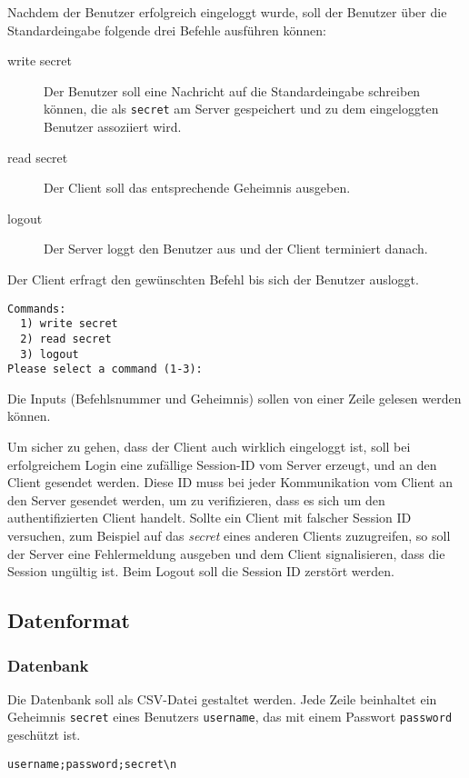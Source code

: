 Nachdem der Benutzer erfolgreich eingeloggt wurde, soll der Benutzer über die
Standardeingabe folgende drei Befehle ausführen können:
\begin{description}
\item[write secret] Der Benutzer soll eine Nachricht auf die Standardeingabe
  schreiben können, die als \texttt{secret} am Server gespeichert und zu dem
  eingeloggten Benutzer assoziiert wird.
\item[read secret] Der Client soll das entsprechende Geheimnis
  ausgeben. 
\item[logout] Der Server loggt den Benutzer aus und der Client terminiert
  danach.
\end{description}

Der Client erfragt den gewünschten Befehl bis sich der Benutzer ausloggt.
\begin{verbatim}
Commands:
  1) write secret
  2) read secret
  3) logout
Please select a command (1-3):
\end{verbatim}

Die Inputs (Befehlsnummer und Geheimnis) sollen von einer Zeile gelesen werden
können.

Um sicher zu gehen, dass der Client auch wirklich eingeloggt ist, soll bei
erfolgreichem Login eine zufällige Session-ID vom Server erzeugt, und an den
Client gesendet werden. Diese ID muss bei jeder Kommunikation vom Client an den
Server gesendet werden, um zu verifizieren, dass es sich um den
authentifizierten Client handelt.  Sollte ein Client mit falscher Session ID
versuchen, zum Beispiel auf das \textit{secret} eines anderen Clients
zuzugreifen, so soll der Server eine Fehlermeldung ausgeben und dem Client
signalisieren, dass die Session ungültig ist.  Beim Logout soll die Session ID
zerstört werden.


\subsection*{Datenformat}

\subsubsection*{Datenbank}

Die Datenbank soll als CSV-Datei gestaltet werden. Jede Zeile beinhaltet ein
Geheimnis \texttt{secret} eines Benutzers \texttt{username}, das mit einem
Passwort \texttt{password} geschützt ist.

\begin{verbatim}
username;password;secret\n
\end{verbatim}

